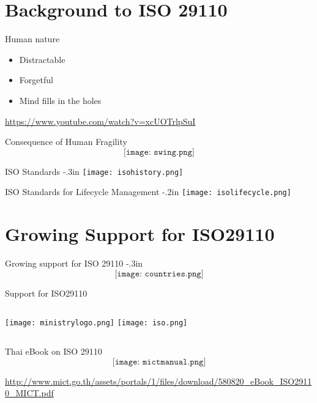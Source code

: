 \section{Background to ISO 29110}
\begin{frame}{Human nature}
\begin{itemize}
\item Distractable
\item Forgetful
\item Mind fills in the holes
\end{itemize}
\bigskip
\url{https://www.youtube.com/watch?v=xcUOTrlpSuI}
\end{frame}

\begin{frame}{Consequence of Human Fragility}
$$\texttt{[image: swing.png]}$$
\end{frame}

\begin{frame}{ISO Standards}
\kern -.3in
\texttt{[image: isohistory.png]}
\end{frame}

\begin{frame}{ISO Standards for Lifecycle Management}
\kern -.2in
\texttt{[image: isolifecycle.png]}
\end{frame}

\section{Growing Support for ISO29110}
\begin{frame}{Growing support for ISO 29110}
\kern -.3in
$$\texttt{[image: countries.png]}$$
\end{frame}

\begin{frame}{Support for ISO29110}
\begin{columns}
\texttt{[image: ministrylogo.png]}
\column{.1in}
\relax
{}
\texttt{[image: iso.png]}
\column{.1in}
\relax
\end{columns}
\end{frame}

\begin{frame}{Thai eBook on ISO 29110}
$$\texttt{[image: mictmanual.png]}$$

\tiny
\url{http://www.mict.go.th/assets/portals/1/files/download/580820_eBook_ISO29110_MICT.pdf}
\end{frame}

